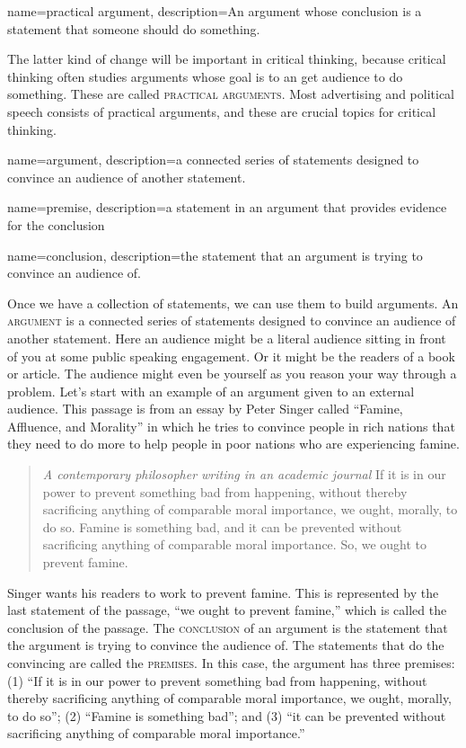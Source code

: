 {
name=practical argument,
description={An argument whose conclusion is a statement that someone should do something.}
}

The latter kind of change will be important in critical thinking, because critical thinking often studies arguments whose goal is to an get audience to do something. These are called \textsc{\glspl{practical argument}}\label{def:practical_argument}. Most advertising and political speech consists of practical arguments, and these are crucial topics for critical thinking.

{
name=argument,
description={a connected series of statements designed to convince an audience of another statement.}
}

{
name=premise,
description={a statement in an argument that provides evidence for the conclusion}
}

{
name=conclusion,
description={the statement that an argument is trying to convince an audience of.}
}

 
Once we have a collection of statements, we can use them to build arguments. An \textsc{\gls{argument}} \label{def:Argument} is a connected series of statements designed to convince an audience of another statement. Here an audience might be a literal audience sitting in front of you at some public speaking engagement. Or it might be the readers of a book or article. The audience might even be yourself as you reason your way through a problem. Let's start with an example of an argument given to an external audience. This passage is from an essay by Peter Singer called ``Famine, Affluence, and Morality'' in which he tries to convince people in rich nations that they need to do more to help people in poor nations who are experiencing famine.

\begin{quotation}\noindent \textit{A contemporary philosopher writing in an academic journal} If it is in our power to prevent something bad from happening, without thereby sacrificing anything of comparable moral importance, we ought, morally, to do so. Famine is something bad, and it can be prevented without sacrificing anything of comparable moral importance. So, we ought to prevent famine. \citep{Singer1972} \label{singer_quote} \end{quotation} 

Singer wants his readers to work to prevent famine. This is represented by the last statement of the passage, ``we ought to prevent famine,'' which is called the conclusion of the passage. The \textsc{\gls{conclusion}} \label{def:conclusion} of an argument is the statement that the argument is trying to convince the audience of. The statements that do the convincing are called the \textsc{\glspl{premise}}. \label{def:premise}In this case, the argument has three premises: (1) ``If it is in our power to prevent something bad from happening, without thereby sacrificing anything of comparable moral importance, we ought, morally, to do so''; (2) ``Famine is something bad''; and (3) ``it can be prevented without sacrificing anything of comparable moral importance.''

